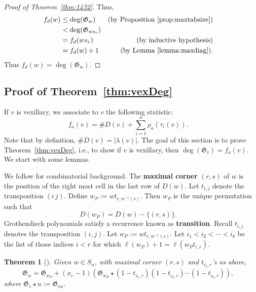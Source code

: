 \documentclass[12pt]{amsart}
\newtheorem{theorem}{Theorem}[section]
\theoremstyle{definition}
\theoremstyle{remark}
\numberwithin{equation}{section}
\newcommand\mydef[1]{{\bf #1}}
\newcommand{\maxsizeantidiag}{\rho_a}
\newcommand{\diagstat}{f_d}
\newcommand{\antidiagstat}{f_a}
\begin{document}
\begin{proof}[Proof of Theorem~\ref{thm:1432}]
	
	Thus,
	\begin{align*}
		\diagstat(w)&\leq \deg(\mathfrak G_w) &\text{(by Proposition~\ref{prop:maxtabsize})}\\
		&<\deg(\mathfrak G_{ws_r}) & \\
		&=\diagstat(ws_r) &\text{(by inductive hypothesis)}\\
			&=\diagstat(w)+1 &\text{(by Lemma~\ref{lemma:maxdiag}).}
	\end{align*}
Thus $\diagstat(w)= \deg(\mathfrak G_w)$.
\end{proof}





\subsection{Proof of Theorem~\ref{thm:vexDeg}}

 If $v$ is vexillary, we associate to $v$ the following statistic:
\begin{equation}
\label{eqn:dv}
\antidiagstat(v)= \#D(v)+\sum_{i=1}^n \maxsizeantidiag(\tau_i(v)).
\end{equation}
Note that by definition, $\#D(v)=|\lambda(v)|.$
The goal of this section is to prove Theorem~\ref{thm:vexDeg}, i.e., to show
if $v$ is vexillary, then $\deg(\mathfrak G_v)=\antidiagstat(v)$.
We start with some lemmas.


 We follow \cite{KMY} for combinatorial background. The \mydef{maximal corner} $(r,s)$ of $w$ is the position of the right most cell in the last row of $D(w)$. Let $t_{i,j}$ denote the transposition $(i \, j)$.
Define $w_P:=wt_{r,w^{-1}(s)}$. Then $w_P$ is the unique permutation such that
\begin{equation}\label{eq:wPdef}
    D(w_P)=D(w)-\{(r,s)\}.
\end{equation}
Grothendieck polynomials satisfy a recurrence known as \mydef{transition}.  
Recall $t_{i,j}$ denotes the transposition $(i,j)$.  Let $w_P:=wt_{r,w^{-1}(s)}$. Let $i_1<i_2<\cdots<i_k$ be the list of those indices $i<r$ for which $\ell(w_P)+1=\ell(w_Pt_{i,r})$.

 \begin{theorem}[{\cite{Lascoux.Transition}}]
\label{thm:transition} Given $w\in S_n$, with maximal corner $(r,s)$ and $t_{i_j,r}$'s as above,
\[ \mathfrak G_w=\mathfrak G_{w_P}+(x_r-1)(\mathfrak G_{w_P}\star(1-t_{i_1,r})(1-t_{i_2,r})\cdots(1-t_{i_k,r})),\] where
$\mathfrak G_v\star u:=\mathfrak G_{vu}$.
\end{theorem}
\end{document}
